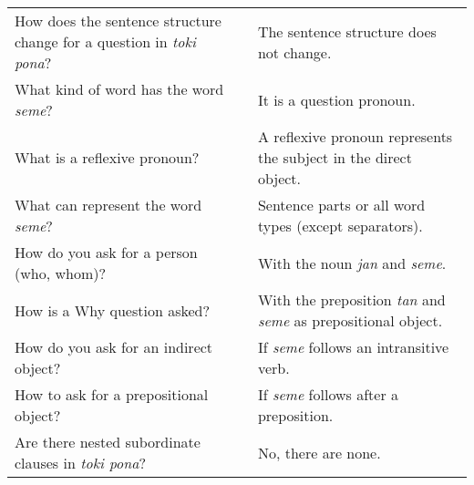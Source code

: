 \begin{supertabular}{p{5,5cm}|ll}
    How does the sentence structure change for a question in \textit{toki pona}? &  & The sentence structure does not change.                                      \\
    What kind of word has the word \textit{seme}?                                &  & It is a question pronoun.                                                    \\
    What is a reflexive pronoun?                                                 &  & A reflexive pronoun represents the subject in the direct object.             \\
    What can represent the word \textit{seme}?                                   &  & Sentence parts or all word types (except separators).                        \\
    How do you ask for a person (who, whom)?                                     &  & With the noun \textit{jan} and \textit{seme}.                                \\
    How is a Why question asked?                                                 &  & With the preposition \textit{tan} and \textit{seme} as prepositional object. \\
    How do you ask for an indirect object?                                       &  & If \textit{seme} follows an intransitive verb.                               \\
    How to ask for a prepositional object?                                       &  & If \textit{seme} follows after a preposition.                                \\
    Are there nested subordinate clauses in \textit{toki pona}?                  &  & No, there are none.                                                          \\
\end{supertabular}

